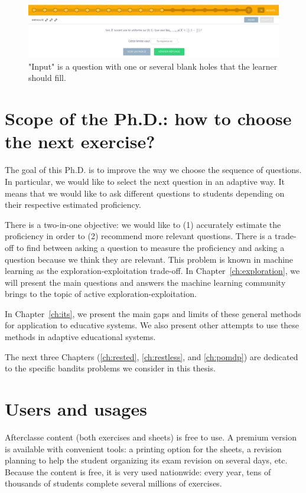 \begin{figure}[ht]
\centering
\includegraphics[clip, width= \textwidth]{2literature/fig/input.png}
\caption{"Input" is a question with one or several blank holes that the learner should fill. }
\label{fig:input}
\end{figure}

\clearpage
\section{Scope of the Ph.D.: how to choose the next exercise?}
The goal of this Ph.D. is to improve the way we choose the sequence of questions. In particular, we would like to select the next question in an adaptive way. It means that we would like to ask different questions to students depending on their respective estimated proficiency. 

There is a two-in-one objective: we would like to (1) accurately estimate the proficiency in order to (2) recommend more relevant questions. There is a trade-off to find between asking a question to measure the proficiency and asking a question because we think they are relevant. This problem is known in machine learning as the exploration-exploitation trade-off. In Chapter~\ref{ch:exploration}, we will present the main questions and answers the machine learning community brings to the topic of active exploration-exploitation.

In Chapter~\ref{ch:its}, we present the main gaps and limits of these general methods for application to educative systems. We also present other attempts to use these methods in adaptive educational systems.

The next three Chapters (\ref{ch:rested}, \ref{ch:restless}, and \ref{ch:pomdp}) are dedicated to the specific bandits problems we consider in this thesis.

\section{Users and usages}
Afterclasse content (both exercises and sheets) is free to use. A premium version is available with convenient tools: a printing option for the sheets, a revision planning to help the student organizing its exam revision on several days, etc. Because the content is free, it is very used nationwide: every year, tens of thousands of students complete several millions of exercises.

